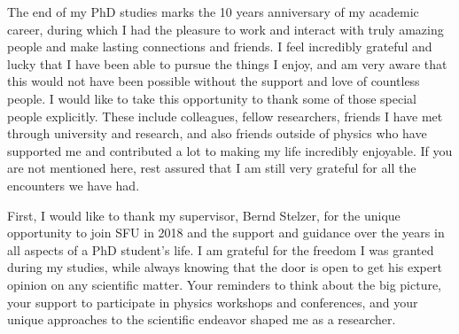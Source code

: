 The end of my PhD studies marks the 10 years anniversary of my academic career, during which I had the pleasure to work and interact with truly amazing people and make lasting connections and friends.
I feel incredibly grateful and lucky that I have been able to pursue the things I enjoy, and am very aware that this would not have been possible without the support and love of countless people. 
I would like to take this opportunity to thank some of those special people explicitly.
These include colleagues, fellow researchers, friends I have met through university and research, and also friends outside of physics who have supported me and contributed a lot to making my life incredibly enjoyable. 
If you are not mentioned here, rest assured that I am still very grateful for all the encounters we have had.

First, I would like to thank my supervisor, Bernd Stelzer, for the unique opportunity to join SFU in 2018 and the support and guidance over the years in all aspects of a PhD student's life. 
I am grateful for the freedom I was granted during my studies, while always knowing that the door is open to get his expert opinion on any scientific matter.
Your reminders to think about the big picture, your support to participate in physics workshops and conferences, and your unique approaches to the scientific endeavor shaped me as a researcher. 

